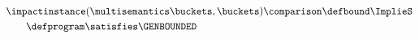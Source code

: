 \begin{align*}
  &\impactinstance(\multisemantics\buckets, \buckets) \comparison \defbound \ImplieS \\
  &\qquad \defprogram \satisfies \GENBOUNDED
\end{align*}
